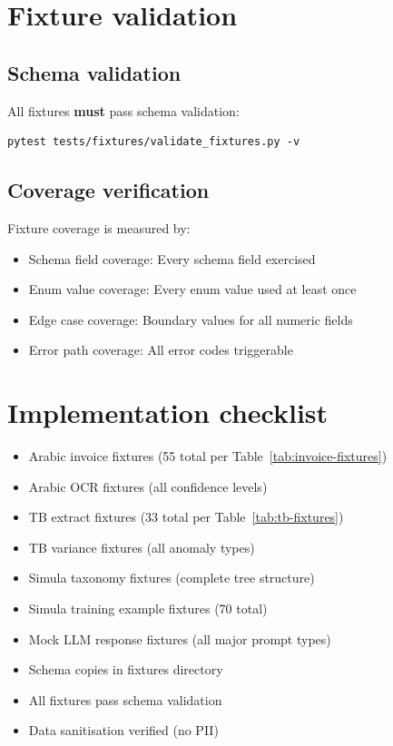 \section{Fixture validation}

\subsection{Schema validation}

All fixtures \textbf{must} pass schema validation:

\begin{lstlisting}[basicstyle=\ttfamily\small]
pytest tests/fixtures/validate_fixtures.py -v
\end{lstlisting}

\subsection{Coverage verification}

Fixture coverage is measured by:
\begin{itemize}
  \item Schema field coverage: Every schema field exercised
  \item Enum value coverage: Every enum value used at least once
  \item Edge case coverage: Boundary values for all numeric fields
  \item Error path coverage: All error codes triggerable
\end{itemize}

\section{Implementation checklist}

\begin{itemize}
  \item[\texttt{[ ]}] Arabic invoice fixtures (55 total per Table~\ref{tab:invoice-fixtures})
  \item[\texttt{[ ]}] Arabic OCR fixtures (all confidence levels)
  \item[\texttt{[ ]}] TB extract fixtures (33 total per Table~\ref{tab:tb-fixtures})
  \item[\texttt{[ ]}] TB variance fixtures (all anomaly types)
  \item[\texttt{[ ]}] Simula taxonomy fixtures (complete tree structure)
  \item[\texttt{[ ]}] Simula training example fixtures (70 total)
  \item[\texttt{[ ]}] Mock LLM response fixtures (all major prompt types)
  \item[\texttt{[ ]}] Schema copies in fixtures directory
  \item[\texttt{[ ]}] All fixtures pass schema validation
  \item[\texttt{[ ]}] Data sanitisation verified (no PII)
\end{itemize}
